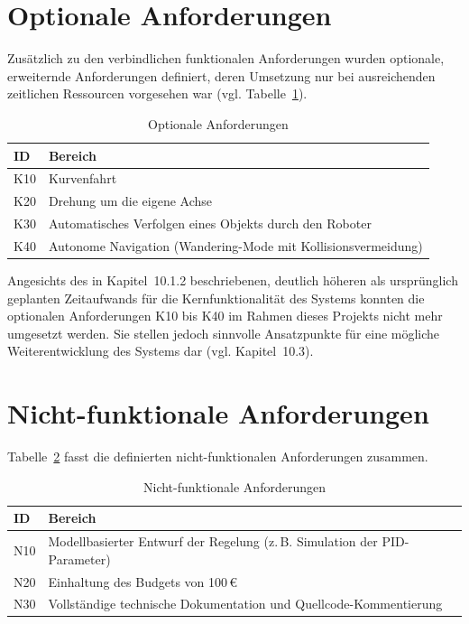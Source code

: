\documentclass[12pt,ngerman,numbers=noenddot,abstracton,headsepline]{scrreprt}
\begin{document}
\section{Optionale Anforderungen}
\label{sec:optionale_anforderungen}

Zusätzlich zu den verbindlichen funktionalen Anforderungen wurden optionale, erweiternde Anforderungen definiert, deren Umsetzung nur bei ausreichenden zeitlichen Ressourcen vorgesehen war (vgl. Tabelle~\ref{tab:optionale_anforderungen}).

\begin{table}[h]
    \centering
    \caption{Optionale Anforderungen}
    \label{tab:optionale_anforderungen}
    \begin{tabular}{|l|l|}
        \hline
        \textbf{ID} & \textbf{Bereich} \\
        \hline
        K10 & Kurvenfahrt \\
        \hline
        K20 & Drehung um die eigene Achse \\
        \hline
        K30 & Automatisches Verfolgen eines Objekts durch den Roboter \\
        \hline
        K40 & Autonome Navigation (Wandering-Mode mit Kollisionsvermeidung) \\
        \hline
    \end{tabular}
\end{table}

Angesichts des in Kapitel~10.1.2 beschriebenen, deutlich höheren als ursprünglich geplanten Zeitaufwands für die Kernfunktionalität des Systems konnten die optionalen Anforderungen K10 bis K40 im Rahmen dieses Projekts nicht mehr umgesetzt werden. Sie stellen jedoch sinnvolle Ansatzpunkte für eine mögliche Weiterentwicklung des Systems dar (vgl. Kapitel~10.3).

\section{Nicht-funktionale Anforderungen}
\label{sec:nichtfunktionale_anforderungen}

Tabelle~\ref{tab:nichtfunktionale_anforderungen} fasst die definierten nicht-funktionalen Anforderungen zusammen.

\begin{table}[h]
    \centering
    \caption{Nicht-funktionale Anforderungen}
    \label{tab:nichtfunktionale_anforderungen}
    \begin{tabular}{|l|p{9cm}|}
        \hline
        \textbf{ID} & \textbf{Bereich} \\
        \hline
        N10 & Modellbasierter Entwurf der Regelung (z.\,B. Simulation der PID-Parameter) \\
        \hline
        N20 & Einhaltung des Budgets von 100\,€ \\
        \hline
        N30 & Vollständige technische Dokumentation und Quellcode-Kommentierung \\
        \hline
    \end{tabular}
\end{table}
\end{document}

